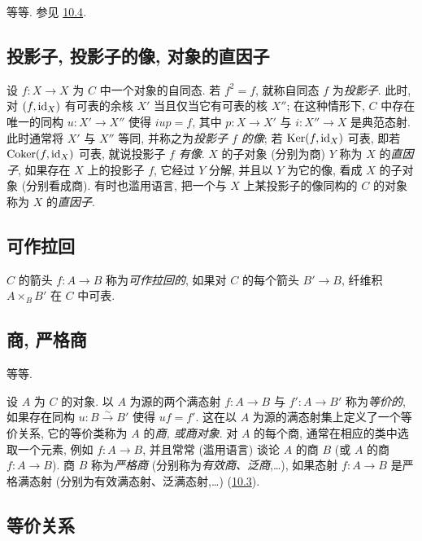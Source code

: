 等等. 参见 \hyperref[I.sec10.4]{10.4}.

\subsection{投影子, 投影子的像, 对象的直因子}

设 $f:X\rightarrow X$ 为 $C$ 中一个对象的自同态. 若 $f^2=f$, 就称自同态 $f$ 为\emph{投影子}. 此时, 对 $(f,\operatorname{id}_X)$ 有可表的余核 $X'$ 当且仅当它有可表的核 $X''$; 在这种情形下, $C$ 中存在唯一的同构 $u:X'\rightarrow X''$ 使得 $iup=f$, 其中 $p:X\rightarrow X'$ 与 $i:X''\rightarrow X$ 是典范态射.
此时通常将 $X'$ 与 $X''$ 等同, 并称之为\emph{投影子 $f$ 的像}; 若 $\operatorname{Ker}(f,\operatorname{id}_X)$ 可表, 即若 $\operatorname{Coker}(f,\operatorname{id}_X)$ 可表, 就说投影子 $f$ \emph{有像}. $X$ 的子对象 (分别为商) $Y$ 称为 $X$ 的\emph{直因子}, 如果存在 $X$ 上的投影子 $f$, 它经过 $Y$ 分解, 并且以 $Y$ 为它的像, 看成 $X$ 的子对象 (分别看成商). 有时也滥用语言, 把一个与 $X$ 上某投影子的像同构的 $C$ 的对象称为 $X$ 的\emph{直因子}.

\subsection{可作拉回}

$C$ 的箭头 $f:A\rightarrow B$ 称为\emph{可作拉回的}, 如果对 $C$ 的每个箭头 $B'\rightarrow B$, 纤维积 $A\times_B B'$ 在 $C$ 中可表.

\subsection{商, 严格商}

等等\pageoriginale.

设 $A$ 为 $C$ 的对象. 以 $A$ 为源的两个满态射 $f:A\rightarrow B$ 与 $f':A\rightarrow B'$ 称为\emph{等价的}, 如果存在同构 $u:B\xrightarrow{\sim}B'$ 使得 $uf=f'$. 这在以 $A$ 为源的满态射集上定义了一个等价关系, 它的等价类称为 $A$ 的\emph{商, 或商对象}. 对 $A$ 的每个商, 通常在相应的类中选取一个元素, 例如 $f:A\rightarrow B$, 并且常常 (滥用语言) 谈论 $A$ 的商 $B$ (或 $A$ 的商 $f:A\rightarrow B$). 商 $B$ 称为\emph{严格商} (分别称为\emph{有效商、泛商},\ldots), 如果态射 $f:A\rightarrow B$ 是严格满态射 (分别为有效满态射、泛满态射,\ldots) (\hyperref[I.sec10.3]{10.3}).

\subsection{等价关系}

